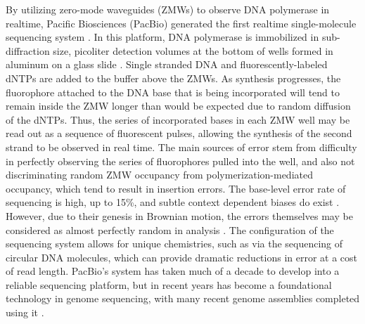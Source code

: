 By utilizing zero-mode waveguides (ZMWs) to observe DNA polymerase in realtime, Pacific Biosciences (PacBio) generated the first realtime single-molecule sequencing system \cite{eid2008real}.
In this platform, DNA polymerase is immobilized in sub-diffraction size, picoliter detection volumes at the bottom of wells formed in aluminum on a glass slide \cite{korlach2008selective}.
Single stranded DNA and fluorescently-labeled dNTPs are added to the buffer above the ZMWs.
As synthesis progresses, the fluorophore attached to the DNA base that is being incorporated will tend to remain inside the ZMW longer than would be expected due to random diffusion of the dNTPs.
Thus, the series of incorporated bases in each ZMW well may be read out as a sequence of fluorescent pulses, allowing the synthesis of the second strand to be observed in real time.
The main sources of error stem from difficulty in perfectly observing the series of fluorophores pulled into the well, and also not discriminating random ZMW occupancy from polymerization-mediated occupancy, which tend to result in insertion errors.
The base-level error rate of sequencing is high, up to 15\%, and subtle context dependent biases do exist \cite{ono2012pbsim}.
However, due to their genesis in Brownian motion, the errors themselves may be considered as almost perfectly random in analysis \cite{ross2013characterizing,myers2014efficient}.
The configuration of the sequencing system allows for unique chemistries, such as via the sequencing of circular DNA molecules, which can provide dramatic reductions in error at a cost of read length.
PacBio's system has taken much of a decade to develop into a reliable sequencing platform, but in recent years has become a foundational technology in genome sequencing, with many recent genome assemblies completed using it \cite{rhoads2015pacbio}.

